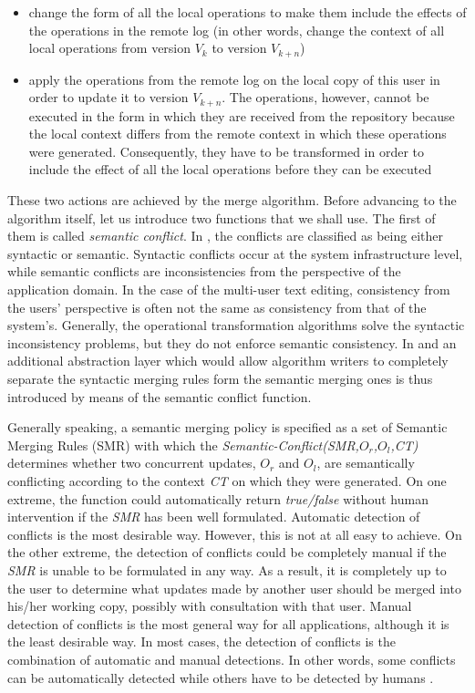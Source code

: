 \begin{itemize}
\item change the form of all the local operations to make them include the effects of the
      operations in the remote log (in other words, change the context of all local operations
      from version $V_{k}$ to version $V_{k+n}$)
\item apply the operations from the remote log on the local copy of this user in order to
      update it to version $V_{k+n}$. The operations, however, cannot be executed in the
      form in which they are received from the repository because the local context differs
      from the remote context in which these operations were generated. Consequently, they
      have to be transformed in order to include the effect of all the local operations before
      they can be executed
\end{itemize}

These two actions are achieved by the merge algorithm. Before advancing to the algorithm itself,
let us introduce two functions that we shall use. The first of them is called \emph{semantic
conflict}. In \cite{dourish96}, the conflicts are classified as being either syntactic or
semantic. Syntactic conflicts occur at the system infrastructure level, while semantic conflicts
are inconsistencies from the perspective of the application domain. In the case of the multi-user
text editing, consistency from the users' perspective is often not the same as consistency from
that of the system's. Generally, the operational transformation algorithms solve the syntactic
inconsistency problems, but they do not enforce semantic consistency. In \cite{munson94} and
\cite{shen02} an additional abstraction layer which would allow algorithm writers to completely
separate the syntactic merging rules form the semantic merging ones is thus introduced by means
of the semantic conflict function.

Generally speaking, a semantic merging policy is specified as a set of Semantic Merging Rules
(SMR) with which the \emph{Semantic-Conflict(SMR,$O_{r}$,$O_{l}$,CT)} determines whether two
concurrent updates, $O_{r}$ and $O_{l}$, are semantically conflicting according to the context
\emph{CT} on which they were generated. On one extreme, the function could automatically return
\emph{true/false} without human intervention if the \emph{SMR} has been well formulated. Automatic
detection of conflicts is the most desirable way. However, this is not at all easy to achieve.
On the other extreme, the detection of conflicts could be completely manual if the \emph{SMR} is
unable to be formulated in any way. As a result, it is completely up to the user to determine
what updates made by another user should be merged into his/her working copy, possibly with
consultation with that user. Manual detection of conflicts is the most general way for all
applications, although it is the least desirable way. In most cases, the detection of conflicts
is the combination of automatic and manual detections. In other words, some conflicts can be
automatically detected while others have to be detected by humans \cite{shen02}.


